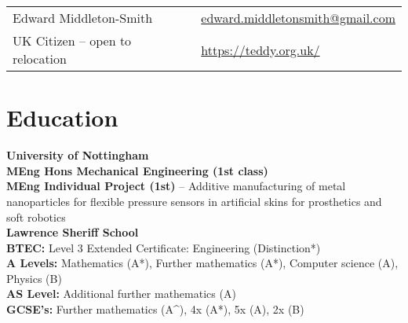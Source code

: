 \documentclass[10pt,a4paper]{article}
\begin{document}
\begin{center}
\begin{tabular}{p{}p{}}
{\huge Edward Middleton-Smith} 
& \href{mailto:edward.middletonsmith@gmail.com}{edward.middletonsmith@gmail.com} \\
\vspace{1pt}
UK Citizen – open to relocation 
& \vspace{1pt}
\href{https://teddy.org.uk/}{https://teddy.org.uk/} \\
\end{tabular}
\end{center}

\section*{Education}\vspace{-\baselineskip}\medskip
\textbf{University of Nottingham} \smallskip\\
\textbf{MEng Hons Mechanical Engineering (1st class)}\smallskip\\
\textbf{MEng Individual Project (1st)} -- Additive manufacturing of metal nanoparticles for flexible pressure sensors in artificial skins for prosthetics and soft robotics\vspace{3pt}\\
\textbf{Lawrence Sheriff School} \smallskip\\
\textbf{BTEC:} Level 3 Extended Certificate: Engineering (Distinction*)\\
\textbf{A Levels:} Mathematics (A*), Further mathematics (A*), Computer science (A), Physics (B)\\
\textbf{AS Level:} Additional further mathematics (A)\\
\textbf{GCSE's:} Further mathematics (A\^{}), 4x (A*), 5x (A), 2x (B)
\end{document}
